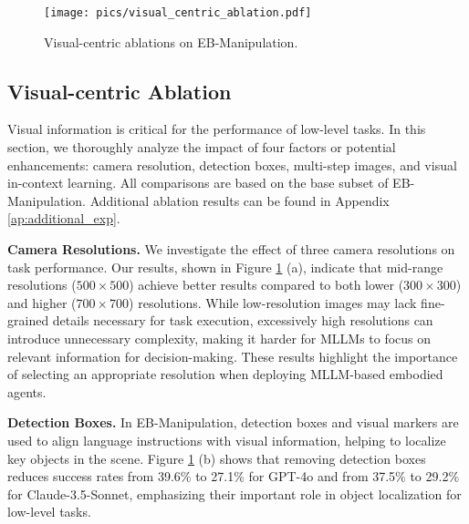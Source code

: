 \vspace{-5pt}
\begin{figure}[h!]
\begin{center}
\texttt{[image: pics/visual\_centric\_ablation.pdf]}
\end{center}
\vspace{-15pt}
\caption{Visual-centric ablations on EB-Manipulation.}
\vspace{-1.5em}
\label{fig:low_level_resolution}
\end{figure}

\subsection{Visual-centric Ablation}\label{sec:visual_ablation}
\vspace{-5pt}

Visual information is critical for the performance of low-level tasks. In this section, we thoroughly analyze the impact of four factors or potential enhancements: camera resolution, detection boxes, multi-step images, and visual in-context learning. All comparisons are based on the base subset of EB-Manipulation. 
Additional ablation results can be found in Appendix \ref{ap:additional_exp}.


\textbf{Camera Resolutions.} We investigate the effect of three camera resolutions on task performance. Our results, shown in Figure \ref{fig:low_level_resolution} (a), indicate that mid-range resolutions ($500 \times 500$) achieve better results compared to both lower ($300 \times 300$) and higher ($700 \times 700$) resolutions. While low-resolution images may lack fine-grained details necessary for task execution, excessively high resolutions can introduce unnecessary complexity, making it harder for MLLMs to focus on relevant information for decision-making. These results highlight the importance of selecting an appropriate resolution when deploying MLLM-based embodied agents.

\textbf{Detection Boxes.} In EB-Manipulation, detection boxes and visual markers are used to align language instructions with visual information, helping to localize key objects in the scene. Figure \ref{fig:low_level_resolution} (b) shows that removing detection boxes reduces success rates from 39.6\% to 27.1\% for GPT-4o and from 37.5\% to 29.2\% for Claude-3.5-Sonnet, emphasizing their important role in object localization for low-level tasks.



